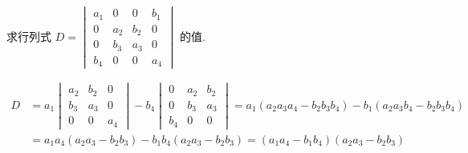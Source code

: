\begin{problem}
  求行列式 $D =
  \begin{vmatrix}
    a_1 & 0   & 0   & b_1\\
    0   & a_2 & b_2 & 0\\
    0   & b_3 & a_3 & 0\\
    b_4 & 0   & 0   & a_4
  \end{vmatrix}$ 的值.
\end{problem}
\scratch
\begin{solution}
  \begin{align*}
    D & = a_1
    \begin{vmatrix}
      a_2 & b_2 & 0\\
      b_3 & a_3 & 0\\
      0   & 0   & a_4
    \end{vmatrix} - b_4
    \begin{vmatrix}
      0   & a_2 & b_2\\
      0   & b_3 & a_3\\
      b_4 & 0   & 0
    \end{vmatrix}
        = a_1(a_2a_3a_4 - b_2b_3b_4) - b_1(a_2a_3b_4 - b_2b_3b_4)\\
      & = a_1a_4(a_2a_3 - b_2b_3) - b_1b_4(a_2a_3 - b_2b_3)
        = (a_1a_4 - b_1b_4)(a_2a_3 - b_2b_3)
  \end{align*}
\end{solution}

